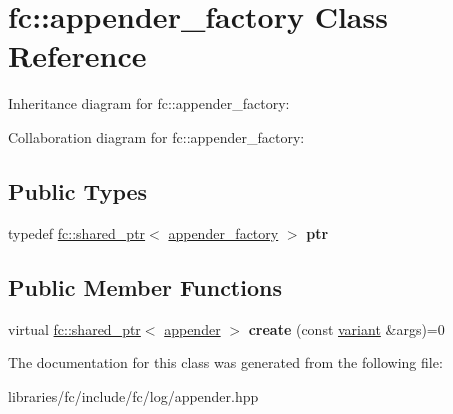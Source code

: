 \hypertarget{classfc_1_1appender__factory}{}\section{fc\+:\+:appender\+\_\+factory Class Reference}
\label{classfc_1_1appender__factory}


Inheritance diagram for fc\+:\+:appender\+\_\+factory\+:


Collaboration diagram for fc\+:\+:appender\+\_\+factory\+:
\subsection*{Public Types}
\begin{DoxyCompactItemize}
\item 
\mbox{\label{classfc_1_1appender__factory_a40b2b5306b2dfadc0b5c9bd5ce9c100c}} 
typedef \mbox{\hyperlink{classfc_1_1shared__ptr}{fc\+::shared\+\_\+ptr}}$<$ \mbox{\hyperlink{classfc_1_1appender__factory}{appender\+\_\+factory}} $>$ {\bfseries ptr}
\end{DoxyCompactItemize}
\subsection*{Public Member Functions}
\begin{DoxyCompactItemize}
\item 
\mbox{\label{classfc_1_1appender__factory_a5dda7b9a0009e2706b0183b9bc14f693}} 
virtual \mbox{\hyperlink{classfc_1_1shared__ptr}{fc\+::shared\+\_\+ptr}}$<$ \mbox{\hyperlink{classfc_1_1appender}{appender}} $>$ {\bfseries create} (const \mbox{\hyperlink{classfc_1_1variant}{variant}} \&args)=0
\end{DoxyCompactItemize}


The documentation for this class was generated from the following file\+:\begin{DoxyCompactItemize}
\item 
libraries/fc/include/fc/log/appender.\+hpp\end{DoxyCompactItemize}
